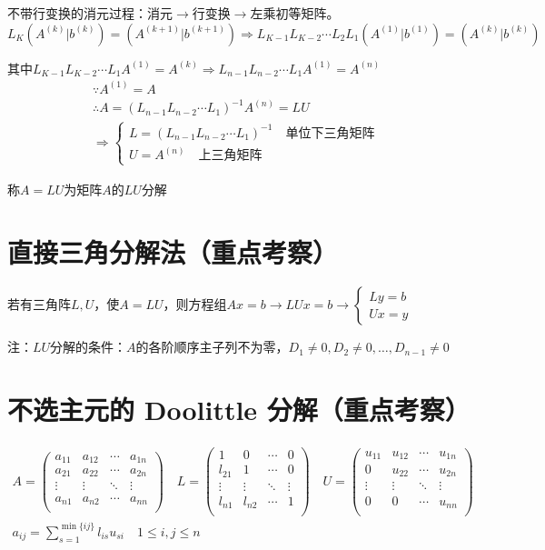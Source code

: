 \documentclass[UTF8,a4paper,11pt,oneside]{ctexbook}
\begin{document}
不带行变换的消元过程：消元\(\to\)行变换\(\to\)左乘初等矩阵。
\[
L_K(A^{(k)}|b^{(k)})=(A^{(k+1)}|b^{(k+1)})\Rightarrow L_{K-1}L_{K-2}\cdots L_2L_1(A^{(1)}|b^{(1)})=(A^{(k)}|b^{(k)})
\]

其中\(L_{K-1}L_{K-2}\cdots L_1A^{(1)}=A^{(k)}\Rightarrow L_{n-1}L_{n-2}\cdots L_1A^{(1)}=A^{(n)}\)
\[
\begin{array}{l}
    \because A^{(1)}=A\\
    \therefore A=(L_{n-1}L_{n-2}\cdots L_1)^{-1}A^{(n)}=LU\\
    \Rightarrow
    \begin{cases}
        L=(L_{n-1}L_{n-2}\cdots L_1)^{-1}\quad\text{单位下三角矩阵}\\
        U=A^{(n)}\quad\text{上三角矩阵}
    \end{cases}
\end{array}
\]

称\(A=LU\)为矩阵\(A\)的\(LU\)分解

\section{直接三角分解法（重点考察）}

若有三角阵\(L,U\)，使\(A=LU\)，则方程组\(Ax=b\to LUx=b\to\begin{cases}
    Ly=b\\
    Ux=y
\end{cases}\)

注：\(LU\)分解的条件：\(A\)的各阶顺序主子列不为零，\(D_1\neq0,D_2\neq0,\ldots,D_{n-1}\neq0\)

\section{不选主元的 Doolittle 分解（重点考察）}
\begin{gather*}
A=\begin{pmatrix}
    a_{11} & a_{12} & \cdots & a_{1n}\\
    a_{21} & a_{22} & \cdots & a_{2n}\\
    \vdots & \vdots & \ddots & \vdots\\
    a_{n1} & a_{n2} & \cdots & a_{nn}\\
\end{pmatrix}
\quad
L=\begin{pmatrix}
    1 & 0 & \cdots & 0\\
    l_{21} & 1 & \cdots & 0\\
    \vdots & \vdots & \ddots & \vdots\\
    l_{n1} & l_{n2} & \cdots & 1\\
\end{pmatrix}
\quad
U=\begin{pmatrix}
    u_{11} & u_{12} & \cdots & u_{1n}\\
    0 & u_{22} & \cdots & u_{2n}\\
    \vdots & \vdots & \ddots & \vdots\\
    0 & 0 & \cdots & u_{nn}\\
\end{pmatrix}\\
a_{ij}=\sum_{s=1}^{\min\{ij\}}l_{is}u_{si}\quad1\leq i,j\leq n
\end{gather*}
\end{document}
